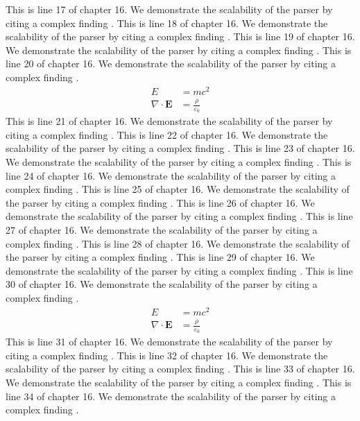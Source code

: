 This is line 17 of chapter 16. We demonstrate the scalability of the parser by citing a complex finding \cite{ref16_17}.
This is line 18 of chapter 16. We demonstrate the scalability of the parser by citing a complex finding \cite{ref16_18}.
This is line 19 of chapter 16. We demonstrate the scalability of the parser by citing a complex finding \cite{ref16_19}.
This is line 20 of chapter 16. We demonstrate the scalability of the parser by citing a complex finding \cite{ref16_20}.
\begin{align*}
  E &= mc^2 \\
  \nabla \cdot \mathbf{E} &= \frac{\rho}{\varepsilon_0}
\end{align*}
This is line 21 of chapter 16. We demonstrate the scalability of the parser by citing a complex finding \cite{ref16_21}.
This is line 22 of chapter 16. We demonstrate the scalability of the parser by citing a complex finding \cite{ref16_22}.
This is line 23 of chapter 16. We demonstrate the scalability of the parser by citing a complex finding \cite{ref16_23}.
This is line 24 of chapter 16. We demonstrate the scalability of the parser by citing a complex finding \cite{ref16_24}.
This is line 25 of chapter 16. We demonstrate the scalability of the parser by citing a complex finding \cite{ref16_25}.
This is line 26 of chapter 16. We demonstrate the scalability of the parser by citing a complex finding \cite{ref16_26}.
This is line 27 of chapter 16. We demonstrate the scalability of the parser by citing a complex finding \cite{ref16_27}.
This is line 28 of chapter 16. We demonstrate the scalability of the parser by citing a complex finding \cite{ref16_28}.
This is line 29 of chapter 16. We demonstrate the scalability of the parser by citing a complex finding \cite{ref16_29}.
This is line 30 of chapter 16. We demonstrate the scalability of the parser by citing a complex finding \cite{ref16_30}.
\begin{align*}
  E &= mc^2 \\
  \nabla \cdot \mathbf{E} &= \frac{\rho}{\varepsilon_0}
\end{align*}
This is line 31 of chapter 16. We demonstrate the scalability of the parser by citing a complex finding \cite{ref16_31}.
This is line 32 of chapter 16. We demonstrate the scalability of the parser by citing a complex finding \cite{ref16_32}.
This is line 33 of chapter 16. We demonstrate the scalability of the parser by citing a complex finding \cite{ref16_33}.
This is line 34 of chapter 16. We demonstrate the scalability of the parser by citing a complex finding \cite{ref16_34}.
